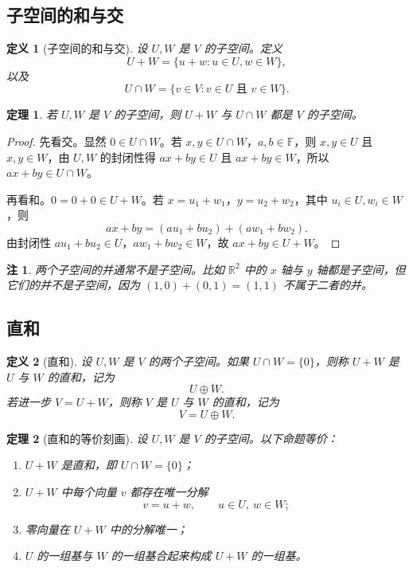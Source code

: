 \documentclass[UTF8,openany,zihao=-4]{ctexbook}
\theoremstyle{cnplain}
\newtheorem{definition}{定义}[chapter]
\newtheorem{theorem}{定理}[chapter]
\newtheorem{remark}{注}[chapter]
\newcommand{\F}{\mathbb F}
\newcommand{\R}{\mathbb R}
\begin{document}
\subsection{子空间的和与交}

\begin{definition}[子空间的和与交]
设 $U,W$ 是 $V$ 的子空间。定义
\[
U+W=\{u+w:u\in U,
 w\in W\},
\]
以及
\[
U\cap W=\{v\in V:v\in U \text{ 且 } v\in W\}.
\]
\end{definition}

\begin{theorem}
若 $U,W$ 是 $V$ 的子空间，则 $U+W$ 与 $U\cap W$ 都是 $V$ 的子空间。
\end{theorem}

\begin{proof}
先看交。显然 $0\in U\cap W$。若 $x,y\in U\cap W$，$a,b\in\F$，则 $x,y\in U$ 且 $x,y\in W$，由 $U,W$ 的封闭性得 $ax+by\in U$ 且 $ax+by\in W$，所以 $ax+by\in U\cap W$。

再看和。$0=0+0\in U+W$。若 $x=u_1+w_1$，$y=u_2+w_2$，其中 $u_i\in U,w_i\in W$，则
\[
ax+by=(au_1+bu_2)+(aw_1+bw_2).
\]
由封闭性 $au_1+bu_2\in U$，$aw_1+bw_2\in W$，故 $ax+by\in U+W$。
\end{proof}

\begin{remark}
两个子空间的并通常不是子空间。比如 $\R^2$ 中的 $x$ 轴与 $y$ 轴都是子空间，但它们的并不是子空间，因为 $(1,0)+(0,1)=(1,1)$ 不属于二者的并。
\end{remark}

\subsection{直和}

\begin{definition}[直和]
设 $U,W$ 是 $V$ 的两个子空间。如果 $U\cap W=\{0\}$，则称 $U+W$ 是 $U$ 与 $W$ 的直和，记为
\[
U\oplus W.
\]
若进一步 $V=U+W$，则称 $V$ 是 $U$ 与 $W$ 的直和，记为
\[
V=U\oplus W.
\]
\end{definition}

\begin{theorem}[直和的等价刻画]
设 $U,W$ 是 $V$ 的子空间。以下命题等价：
\begin{enumerate}
  \item $U+W$ 是直和，即 $U\cap W=\{0\}$；
  \item $U+W$ 中每个向量 $v$ 都存在唯一分解
  \[
  v=u+w,
  \qquad u\in U,
  \ w\in W;
  \]
  \item 零向量在 $U+W$ 中的分解唯一；
  \item $U$ 的一组基与 $W$ 的一组基合起来构成 $U+W$ 的一组基。
\end{enumerate}
\end{theorem}
\end{document}
